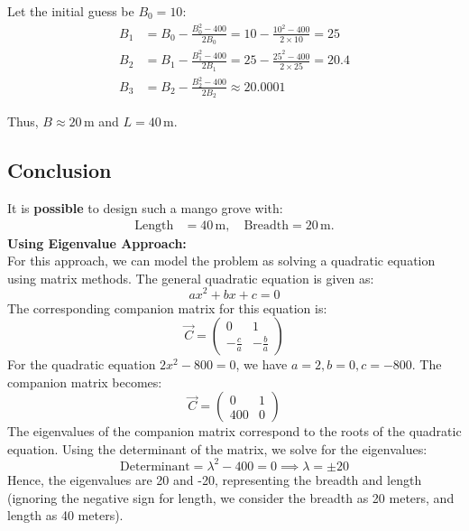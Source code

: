 \documentclass[journal]{IEEEtran}
\begin{document}
Let the initial guess be \( B_0 = 10 \):
\begin{align}
    B_1 &= B_0 - \frac{B_0^2 - 400}{2B_0} = 10 - \frac{10^2 - 400}{2 \times 10} = 25 \\
    B_2 &= B_1 - \frac{B_1^2 - 400}{2B_1} = 25 - \frac{25^2 - 400}{2 \times 25} = 20.4 \\
    B_3 &= B_2 - \frac{B_2^2 - 400}{2B_2} \approx 20.0001
\end{align}

Thus, \( B \approx 20 \, \text{m} \) and \( L = 40 \, \text{m} \).

\subsection*{Conclusion}
It is \textbf{possible} to design such a mango grove with:
\begin{align}
    \text{Length} &= 40 \, \text{m}, \quad \text{Breadth} = 20 \, \text{m}.
\end{align}
\textbf{Using Eigenvalue Approach:} \\
    For this approach, we can model the problem as solving a quadratic equation using matrix methods. The general quadratic equation is given as:
    \[
    ax^2 + bx + c = 0
    \]
    The corresponding companion matrix for this equation is:
    \[
    \vec{C} = \begin{pmatrix} 0 & 1 \\ -\frac{c}{a} & -\frac{b}{a} \end{pmatrix}
    \]
    For the quadratic equation \( 2x^2 - 800 = 0 \), we have \( a = 2, b = 0, c = -800 \). The companion matrix becomes:
    \[
    \vec{C} = \begin{pmatrix} 0 & 1 \\ 400 & 0 \end{pmatrix}
    \]
    The eigenvalues of the companion matrix correspond to the roots of the quadratic equation. Using the determinant of the matrix, we solve for the eigenvalues:
    \[
    \text{Determinant} = \lambda^2 - 400 = 0 \implies \lambda = \pm 20
    \]
    Hence, the eigenvalues are 20 and -20, representing the breadth and length (ignoring the negative sign for length, we consider the breadth as 20 meters, and length as 40 meters).
    
\end{document}
